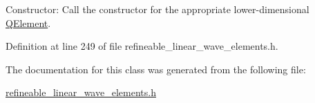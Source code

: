 Constructor\+: Call the constructor for the appropriate lower-\/dimensional \hyperlink{classoomph_1_1QElement}{Q\+Element}. 



Definition at line 249 of file refineable\+\_\+linear\+\_\+wave\+\_\+elements.\+h.



The documentation for this class was generated from the following file\+:\begin{DoxyCompactItemize}
\item 
\hyperlink{refineable__linear__wave__elements_8h}{refineable\+\_\+linear\+\_\+wave\+\_\+elements.\+h}\end{DoxyCompactItemize}
